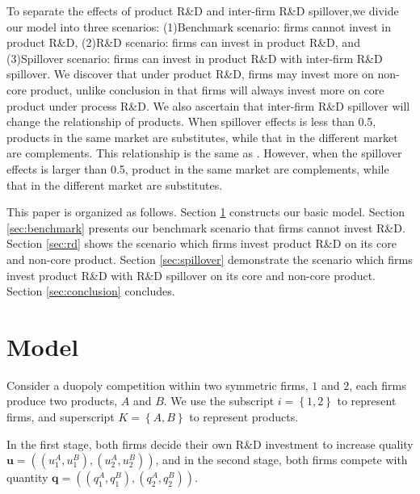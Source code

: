 \documentclass[12pt]{article}
\renewcommand{\vec}[1]{\mathbf{#1}}
\begin{document}
To separate the effects of product R\&D and inter-firm R\&D spillover,we divide our model into three scenarios: (1)Benchmark scenario: firms cannot invest in product R\&D, (2)R\&D scenario: firms can invest in product R\&D, and (3)Spillover scenario: firms can invest in product R\&D with inter-firm R\&D spillover. 
We discover that under product R\&D, firms may invest more on non-core product, unlike conclusion in \textcite{lin_effects_2013} that firms will always invest more on core product under process R\&D. 
We also ascertain that inter-firm R\&D spillover will change the relationship of products.
When spillover effects is less than 0.5, products in the same market are substitutes, while that in the different market are complements.
This relationship is the same as \textcite{lin_effects_2013}.
However, when the spillover effects is larger than 0.5, product in the same market are complements, while that in the different market are substitutes.

This paper is organized as follows. 
Section \ref{sec:model} constructs our basic model.
Section \ref{sec:benchmark} presents our benchmark scenario that firms cannot invest R\&D.
Section \ref{sec:rd} shows the scenario which firms invest product R\&D on its core and non-core product.
Section \ref{sec:spillover} demonstrate the scenario which firms invest product R\&D with R\&D spillover on its core and non-core product.
Section \ref{sec:conclusion} concludes.

\section{Model} \label{sec:model}

Consider a duopoly competition within two symmetric firms, $1$ and $2$, each firms produce two products, $A$ and $B$.
We use the subscript $i=\left\{ 1,2 \right\}$ to represent firms, and superscript $K=\left\{ A,B \right\}$ to represent products.

In the first stage, both firms decide their own R\&D investment to increase quality $\vec{u}=((u_1^A,u_1^B),(u_2^A,u_2^B))$, and in the second stage, both firms compete with quantity $\vec{q}=((q_1^A,q_1^B),(q_2^A,q_2^B))$.
\end{document}
